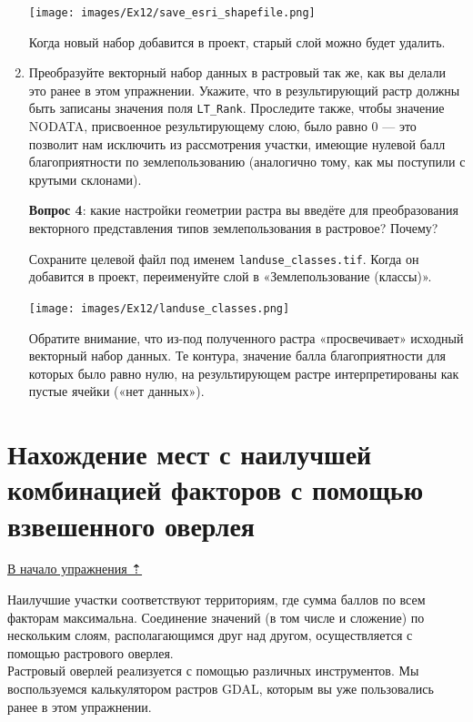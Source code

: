 \documentclass[
  12pt,
]{book}
\begin{document}
\begin{enumerate}
  \texttt{[image: images/Ex12/save\_esri\_shapefile.png]}

  Когда новый набор добавится в проект, старый слой можно будет удалить.
\item
  Преобразуйте векторный набор данных в растровый так же, как вы делали это ранее в этом упражнении. Укажите, что в результирующий растр должны быть записаны значения поля \texttt{LT\_Rank}. Проследите также, чтобы значение NODATA, присвоенное результирующему слою, было равно 0 --- это позволит нам исключить из рассмотрения участки, имеющие нулевой балл благоприятности по землепользованию (аналогично тому, как мы поступили с крутыми склонами).

  \textbf{Вопрос 4}: какие настройки геометрии растра вы введёте для преобразования векторного представления типов землепользования в растровое? Почему?

  Сохраните целевой файл под именем \texttt{landuse\_classes.tif}. Когда он добавится в проект, переименуйте слой в «Землепользование (классы)».

  \texttt{[image: images/Ex12/landuse\_classes.png]}

  Обратите внимание, что из-под полученного растра «просвечивает» исходный векторный набор данных. Те контура, значение балла благоприятности для которых было равно нулю, на результирующем растре интерпретированы как пустые ячейки («нет данных»).
\end{enumerate}

\hypertarget{weighted-overlay-combination}{%
\section{Нахождение мест с наилучшей комбинацией факторов с помощью взвешенного оверлея}\label{weighted-overlay-combination}}

\protect\hyperlink{weighted-overlay}{В начало упражнения ⇡}

Наилучшие участки соответствуют территориям, где сумма баллов по всем факторам максимальна. Соединение значений (в том числе и сложение) по нескольким слоям, располагающимся друг над другом, осуществляется с помощью растрового оверлея.\\
Растровый оверлей реализуется с помощью различных инструментов. Мы воспользуемся калькулятором растров GDAL, которым вы уже пользовались ранее в этом упражнении.
\end{document}
